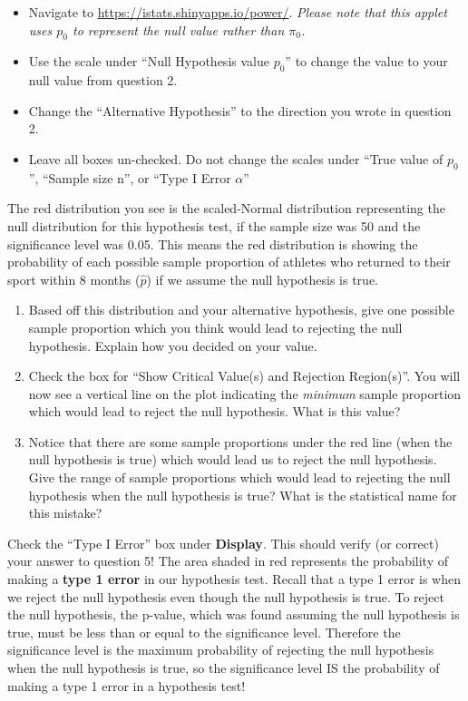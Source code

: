 \documentclass[
]{report}
\begin{document}
\begin{itemize}
\item
  Navigate to \url{https://istats.shinyapps.io/power/}. \emph{Please note that this applet uses \(p_0\) to represent the null value rather than \(\pi_0\).}
\item
  Use the scale under ``Null Hypothesis value \(p_0\)'' to change the value to your null value from question 2.
\item
  Change the ``Alternative Hypothesis'' to the direction you wrote in question 2.
\item
  Leave all boxes un-checked. Do not change the scales under ``True value of \(p_0\)'', ``Sample size n'', or ``Type I Error \(\alpha\)''
\end{itemize}

The red distribution you see is the scaled-Normal distribution representing the null distribution for this hypothesis test, if the sample size was 50 and the significance level was 0.05. This means the red distribution is showing the probability of each possible sample proportion of athletes who returned to their sport within 8 months (\(\hat{p}\)) if we assume the null hypothesis is true.

\begin{enumerate}
\def\labelenumi{\arabic{enumi}.}
\setcounter{enumi}{2}
\item
  Based off this distribution and your alternative hypothesis, give one possible sample proportion which you think would lead to rejecting the null hypothesis. Explain how you decided on your value.
  \vspace{0.25in}
\item
  Check the box for ``Show Critical Value(s) and Rejection Region(s)''. You will now see a vertical line on the plot indicating the \emph{minimum} sample proportion which would lead to reject the null hypothesis. What is this value?\\
  \vspace{0.25in}
\item
  Notice that there are some sample proportions under the red line (when the null hypothesis is true) which would lead us to reject the null hypothesis. Give the range of sample proportions which would lead to rejecting the null hypothesis when the null hypothesis is true? What is the statistical name for this mistake?
  \vspace{0.4in}
\end{enumerate}

Check the ``Type I Error'' box under \textbf{Display}. This should verify (or correct) your answer to question 5! The area shaded in red represents the probability of making a \textbf{type 1 error} in our hypothesis test. Recall that a type 1 error is when we reject the null hypothesis even though the null hypothesis is true. To reject the null hypothesis, the p-value, which was found assuming the null hypothesis is true, must be less than or equal to the significance level. Therefore the significance level is the maximum probability of rejecting the null hypothesis when the null hypothesis is true, so the significance level IS the probability of making a type 1 error in a hypothesis test!
\end{document}
